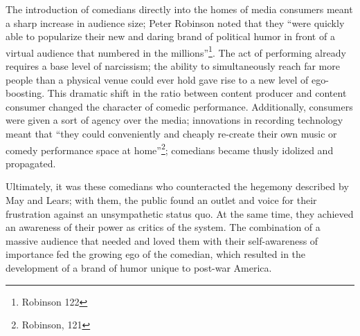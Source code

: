 The introduction of comedians directly into the homes of media consumers meant a
sharp increase in audience size; Peter Robinson noted that they ``were quickly
able to popularize their new and daring brand of political humor in front of a
virtual audience that numbered in the millions''\footnote{Robinson 122}. The act of
performing already requires a base level of narcissism; the ability to
simultaneously reach far more people than a physical venue could ever hold gave
rise to a new level of ego-boosting. This dramatic shift in the ratio between
content producer and content consumer changed the character of comedic
performance. Additionally, consumers were given a sort of agency over the media;
innovations in recording technology meant that ``they could conveniently and
cheaply re-create their own music or comedy performance space at
home''\footnote{Robinson, 121}; comedians became thusly idolized and propagated.

Ultimately, it was these comedians who counteracted the hegemony described by
May and Lears; with them, the public found an outlet and voice for their
frustration against an unsympathetic status quo. At the same time, they achieved
an awareness of their power as critics of the system. The combination of a
massive audience that needed and loved them with their self-awareness of
importance fed the growing ego of the comedian, which resulted in the
development of a brand of humor unique to post-war America.
